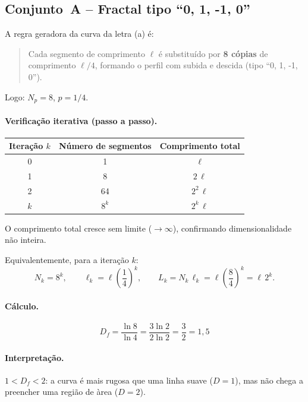 \documentclass[12pt,a4paper]{article}
\theoremstyle{definition}
\newcommand{\resultado}[1]{%
  \begin{center}
    \fbox{\parbox{0.85\linewidth}{\centering $\displaystyle #1$}}
  \end{center}
}
\begin{document}
\subsection{Conjunto~A -- Fractal tipo ``0, 1, -1, 0''}

A regra geradora da curva da letra (a) \'e:
\begin{quote}
  Cada segmento de comprimento $\ell$ \'e substitu\'ido por
  \textbf{8 c\'opias} de comprimento $\ell/4$, formando o perfil
  com subida e descida (tipo ``0, 1, -1, 0'').
\end{quote}
Logo: $N_p = 8$, $p = 1/4$.

\paragraph{Verifica\c{c}\~ao iterativa (passo a passo).}

\begin{center}
\begin{tabular}{ccc}
\toprule
Itera\c{c}\~ao $k$ & N\'umero de segmentos & Comprimento total\\
\midrule
0 & 1             & $\ell$ \\
1 & 8             & $2\,\ell$ \\
2 & 64            & $2^2\,\ell$ \\
$k$ & $8^k$       & $2^k\,\ell$ \\
\bottomrule
\end{tabular}
\end{center}

O comprimento total cresce sem limite ($\to\infty$), confirmando dimensionalidade
n\~ao inteira.

Equivalentemente, para a itera\c{c}\~ao $k$:
\begin{equation}
  N_k = 8^k,
  \qquad
  \ell_k = \ell\left(\frac{1}{4}\right)^k,
  \qquad
  L_k = N_k\,\ell_k = \ell\left(\frac{8}{4}\right)^k = \ell\,2^k.
\end{equation}

\paragraph{C\'alculo.}
\begin{equation}
  D_f = \frac{\ln 8}{\ln 4}
      = \frac{3\ln 2}{2\ln 2}
      = \frac{3}{2} = 1{,}5
\end{equation}
\resultado{D_f = 1{,}5}

\paragraph{Interpreta\c{c}\~ao.}
$1 < D_f < 2$: a curva \'e mais rugosa que uma linha suave ($D=1$),
mas n\~ao chega a preencher uma regi\~ao de \`area ($D=2$).
\end{document}
